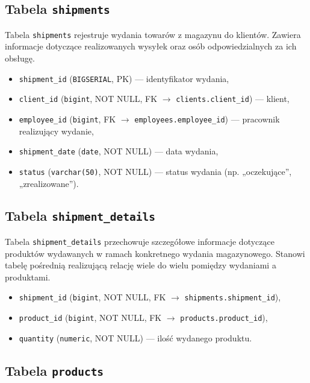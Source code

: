 \subsection{Tabela \texttt{shipments}}

Tabela \texttt{shipments} rejestruje wydania towarów z magazynu do klientów.
Zawiera informacje dotyczące realizowanych wysyłek oraz osób odpowiedzialnych
za ich obsługę.

\begin{itemize}
    \item \texttt{shipment\_id} (\texttt{BIGSERIAL}, PK) — identyfikator wydania,
    \item \texttt{client\_id} (\texttt{bigint}, NOT NULL, FK $\rightarrow$ \texttt{clients.client\_id}) — klient,
    \item \texttt{employee\_id} (\texttt{bigint}, FK $\rightarrow$ \texttt{employees.employee\_id}) — pracownik realizujący wydanie,
    \item \texttt{shipment\_date} (\texttt{date}, NOT NULL) — data wydania,
    \item \texttt{status} (\texttt{varchar(50)}, NOT NULL) — status wydania
    (np. „oczekujące”, „zrealizowane”).
\end{itemize}

\subsection{Tabela \texttt{shipment\_details}}

Tabela \texttt{shipment\_details} przechowuje szczegółowe informacje dotyczące
produktów wydawanych w ramach konkretnego wydania magazynowego.
Stanowi tabelę pośrednią realizującą relację wiele do wielu pomiędzy
wydaniami a produktami.

\begin{itemize}
    \item \texttt{shipment\_id} (\texttt{bigint}, NOT NULL, FK $\rightarrow$ \texttt{shipments.shipment\_id}),
    \item \texttt{product\_id} (\texttt{bigint}, NOT NULL, FK $\rightarrow$ \texttt{products.product\_id}),
    \item \texttt{quantity} (\texttt{numeric}, NOT NULL) — ilość wydanego produktu.
\end{itemize}

\subsection{Tabela \texttt{products}}

